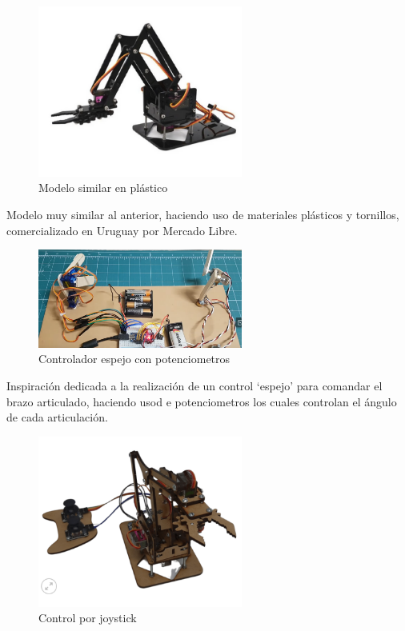 \begin{figure}[H]
  \centering
  \includegraphics[width=0.6\textwidth]{anexos/inspiraciones/7plastico.png}
  \caption{Modelo similar en plástico}\label{fig:insp.plastico}
\end{figure}
Modelo muy similar al anterior, haciendo uso de materiales plásticos y tornillos, comercializado en Uruguay por Mercado Libre.

\begin{figure}[H]
  \centering
  \includegraphics[width=0.6\textwidth]{anexos/inspiraciones/8control.png}
  \caption{Controlador espejo con potenciometros}\label{fig:insp.control}
\end{figure}
Inspiración dedicada a la realización de un control `espejo' para comandar el brazo articulado, haciendo usod e potenciometros los cuales controlan el ángulo de cada articulación.

\begin{figure}[H]
  \centering
  \includegraphics[width=0.6\textwidth]{anexos/inspiraciones/9joystick.png}
  \caption{Control por joystick}\label{fig:insp.joystick}
\end{figure}

